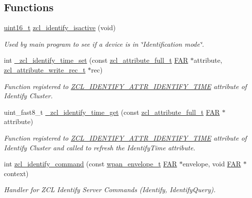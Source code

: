 \subsection*{Functions}
\begin{DoxyCompactItemize}
\item 
\hyperlink{group__hal_ga5a8b2dc9e45a9ee81a94ef304fb62505}{uint16\-\_\-t} \hyperlink{group__zcl__identify_ga95b00d55b861c1ea6033c16794ae818d}{zcl\-\_\-identify\-\_\-isactive} (void)
\begin{DoxyCompactList}\small\item\em Used by main program to see if a device is in \char`\"{}\-Identification mode\char`\"{}. \end{DoxyCompactList}\item 
int \hyperlink{group__zcl__identify_ga40470468c9c1fe4ebfb52612234710b0}{\-\_\-zcl\-\_\-identify\-\_\-time\-\_\-set} (const \hyperlink{structzcl__attribute__full__t}{zcl\-\_\-attribute\-\_\-full\-\_\-t} \hyperlink{group__hal_gaef060b3456fdcc093a7210a762d5f2ed}{F\-A\-R} $\ast$attribute, \hyperlink{structzcl__attribute__write__rec__t}{zcl\-\_\-attribute\-\_\-write\-\_\-rec\-\_\-t} $\ast$rec)
\begin{DoxyCompactList}\small\item\em Function registered to \hyperlink{group__zcl__identify_ga7df877a02f273adc190aa24ad0aff4c9}{Z\-C\-L\-\_\-\-I\-D\-E\-N\-T\-I\-F\-Y\-\_\-\-A\-T\-T\-R\-\_\-\-I\-D\-E\-N\-T\-I\-F\-Y\-\_\-\-T\-I\-M\-E} attribute of Identify Cluster. \end{DoxyCompactList}\item 
uint\-\_\-fast8\-\_\-t \hyperlink{group__zcl__identify_ga7cde47425d0a779f5aff87985ea01951}{\-\_\-zcl\-\_\-identify\-\_\-time\-\_\-get} (const \hyperlink{structzcl__attribute__full__t}{zcl\-\_\-attribute\-\_\-full\-\_\-t} \hyperlink{group__hal_gaef060b3456fdcc093a7210a762d5f2ed}{F\-A\-R} $\ast$attribute)
\begin{DoxyCompactList}\small\item\em Function registered to \hyperlink{group__zcl__identify_ga7df877a02f273adc190aa24ad0aff4c9}{Z\-C\-L\-\_\-\-I\-D\-E\-N\-T\-I\-F\-Y\-\_\-\-A\-T\-T\-R\-\_\-\-I\-D\-E\-N\-T\-I\-F\-Y\-\_\-\-T\-I\-M\-E} attribute of Identify Cluster and called to refresh the Identify\-Time attribute. \end{DoxyCompactList}\item 
int \hyperlink{group__zcl__identify_ga94a1fe7c8892b55e0ffd3e2795139b1d}{zcl\-\_\-identify\-\_\-command} (const \hyperlink{structwpan__envelope__t}{wpan\-\_\-envelope\-\_\-t} \hyperlink{group__hal_gaef060b3456fdcc093a7210a762d5f2ed}{F\-A\-R} $\ast$envelope, void \hyperlink{group__hal_gaef060b3456fdcc093a7210a762d5f2ed}{F\-A\-R} $\ast$context)
\begin{DoxyCompactList}\small\item\em Handler for Z\-C\-L Identify Server Commands (Identify, Identify\-Query). \end{DoxyCompactList}\end{DoxyCompactItemize}
